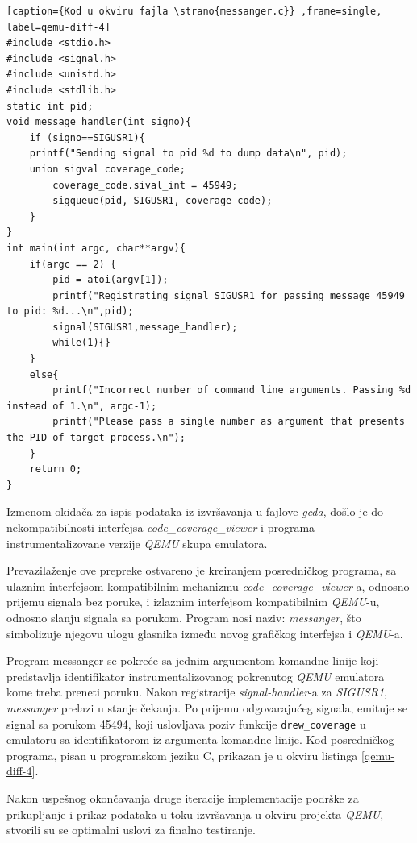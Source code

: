 \documentclass[12pt,oneside]{memoir}
\newcommand{\kod}[1]{\texttt{#1}}
\newcommand{\strano}[1]{\textit{#1}}
\begin{document}
\begin{lstlisting}[caption={Kod u okviru fajla \strano{messanger.c}} ,frame=single, label=qemu-diff-4]
#include <stdio.h>                                                       
#include <signal.h>                                                      
#include <unistd.h>     
#include <stdlib.h>
static int pid;
void message_handler(int signo){
    if (signo==SIGUSR1){
	printf("Sending signal to pid %d to dump data\n", pid);   
	union sigval coverage_code;
        coverage_code.sival_int = 45949;
        sigqueue(pid, SIGUSR1, coverage_code);
    }
}
int main(int argc, char**argv){
	if(argc == 2) {
		pid = atoi(argv[1]);
		printf("Registrating signal SIGUSR1 for passing message 45949 to pid: %d...\n",pid);
		signal(SIGUSR1,message_handler);
		while(1){}
	}
	else{
		printf("Incorrect number of command line arguments. Passing %d instead of 1.\n", argc-1);
		printf("Please pass a single number as argument that presents the PID of target process.\n");
	}
	return 0;
}
\end{lstlisting}


Izmenom okidača za ispis podataka iz izvršavanja u fajlove \strano{gcda}, došlo je do nekompatibilnosti interfejsa \strano{code\_coverage\_viewer} i programa instrumentalizovane verzije \strano{QEMU} skupa emulatora. 

Prevazilaženje ove prepreke ostvareno je kreiranjem posredničkog programa, sa ulaznim interfejsom kompatibilnim mehanizmu \strano{code\_coverage\_viewer}-a, odnosno prijemu signala bez poruke, i izlaznim interfejsom kompatibilnim \strano{QEMU}-u, odnosno slanju signala sa porukom. Program nosi naziv: \strano{messanger}, što simbolizuje njegovu ulogu glasnika između novog grafičkog interfejsa i \strano{QEMU}-a. 

Program messanger se pokreće sa jednim argumentom komandne linije koji predstavlja identifikator instrumentalizovanog pokrenutog \strano{QEMU} emulatora kome treba preneti poruku. Nakon registracije \strano{signal-handler}-a za \strano{SIGUSR1}, \strano{messanger} prelazi u stanje čekanja. Po prijemu odgovarajućeg signala, emituje se signal sa porukom 45494, koji uslovljava poziv funkcije \kod{drew\_coverage} u emulatoru sa identifikatorom iz argumenta komandne linije. Kod posredničkog programa, pisan u programskom jeziku C, prikazan je u okviru listinga \ref{qemu-diff-4}.

Nakon uspešnog okončavanja druge iteracije implementacije podrške za prikupljanje i prikaz podataka u toku izvršavanja u okviru projekta \strano{QEMU}, stvorili su se optimalni uslovi za finalno testiranje. 
\end{document}
